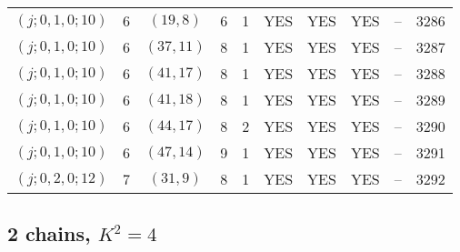 \begin{longtable}{|c|c|c|c|c|c|c|c|c|c|}
$(j; 0, 1, 0; 10)$ & 6 & $(19, 8)$ & 6 & 1 & YES & YES & YES & -- & 3286\\
$(j; 0, 1, 0; 10)$ & 6 & $(37, 11)$ & 8 & 1 & YES & YES & YES & -- & 3287\\
$(j; 0, 1, 0; 10)$ & 6 & $(41, 17)$ & 8 & 1 & YES & YES & YES & -- & 3288\\
$(j; 0, 1, 0; 10)$ & 6 & $(41, 18)$ & 8 & 1 & YES & YES & YES & -- & 3289\\
$(j; 0, 1, 0; 10)$ & 6 & $(44, 17)$ & 8 & 2 & YES & YES & YES & -- & 3290\\
$(j; 0, 1, 0; 10)$ & 6 & $(47, 14)$ & 9 & 1 & YES & YES & YES & -- & 3291\\
$(j; 0, 2, 0; 12)$ & 7 & $(31, 9)$ & 8 & 1 & YES & YES & YES & -- & 3292
\end{longtable}
\subsection{2 chains, $K^2 = 4$}
